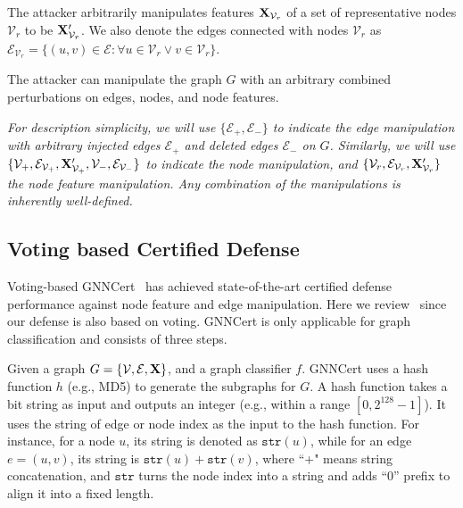 \vspace{+0.05in}
The attacker arbitrarily manipulates features ${\bf X}_{\mathcal{V}_r}$ of a set of representative nodes $\mathcal{V}_{r}$ to be ${\bf X}'_{\mathcal{V}_r}$. 
We also denote the edges connected with nodes $\mathcal{V}_{r}$  
as $\mathcal{E}_{\mathcal{V}_r}=\{(u,v) \in \mathcal{E}: \forall u \in\mathcal{V}_{r} \vee v \in\mathcal{V}_{r} \}$.

\vspace{+0.05in}
 The attacker can manipulate the graph $G$ with an 
arbitrary combined perturbations on 
edges, nodes, and node features. 

\emph{For description simplicity, we will use $\{\mathcal{E}_+, \mathcal{E}_-\}$ to indicate the edge manipulation with arbitrary injected edges $\mathcal{E}_+$  and deleted edges $\mathcal{E}_-$ on $G$. Similarly, we will use $\{\mathcal{V}_+, \mathcal{E}_{\mathcal{V}_+}, {\bf X}'_{\mathcal{V}_+}, \mathcal{V}_-, \mathcal{E}_{\mathcal{V}_-}\}$ to indicate the node manipulation, and $\{\mathcal{V}_r, \mathcal{E}_{\mathcal{V}_r},{\bf X}'_{\mathcal{V}_r}\}$ the node feature manipulation. Any combination of the manipulations is inherently well-defined.}  


\subsection{Voting based Certified Defense}
\label{sec:GNNCert}

Voting-based GNNCert~\cite{xia2024gnncert}
has achieved state-of-the-art certified defense performance against 
node feature and edge manipulation. Here we review~\cite{xia2024gnncert} since  
our defense is also based on voting.   
GNNCert is only applicable for graph classification and consists of three steps.  

\vspace{+0.05in}
 Given a graph $G=\{\mathcal{V},\mathcal{E},{\bf X}\}$, and a graph classifier $f$.  GNNCert uses a hash function $h$ (e.g., MD5) to generate the subgraphs for $G$. A hash function takes a bit string as input and outputs an integer (e.g., within a range $[0,2^{128}-1]$). It uses the string of edge or node index as the input to the hash function. 
For instance, for a node $u$,  its string is denoted as $\texttt{str}(u)$, while for an edge $e=(u,v)$, its string is $\texttt{str}(u)+\texttt{str}(v)$, where ``+" means string concatenation, and $\texttt{str}$ turns the node index into a string and adds “0” prefix to align it into a fixed length. 



